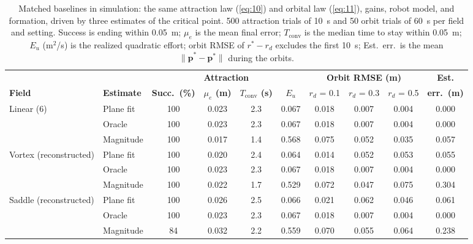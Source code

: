 \begin{table}[!t]
\centering
\footnotesize
\caption{Matched baselines in simulation: the same attraction law (\ref{eq:10}) and orbital law (\ref{eq:11}), gains, robot model, and formation, driven by three estimates of the critical point. 500 attraction trials of 10~s and 50 orbit trials of 60~s per field and setting. Success is ending within 0.05~m; $\mu_e$ is the mean final error; $T_{\mathrm{conv}}$ is the median time to stay within 0.05~m; $E_u$ (m$^2$/s) is the realized quadratic effort; orbit RMSE of $r^* - r_d$ excludes the first 10~s; Est.\ err.\ is the mean $\|\hat{\mathbf{p}}^* - \mathbf{p}^*\|$ during the orbits.}
\label{tab:baselines}
\setlength{\tabcolsep}{2.5pt}
\begin{tabular}{llcccc|ccc|c}
\hline
 & & \multicolumn{4}{c|}{\textbf{Attraction}} & \multicolumn{3}{c|}{\textbf{Orbit RMSE (m)}} & \textbf{Est.} \\
\textbf{Field} & \textbf{Estimate} & \textbf{Succ.\ (\%)} & \textbf{$\mu_e$ (m)} & \textbf{$T_{\mathrm{conv}}$ (s)} & \textbf{$E_u$} & $r_d$ = 0.1 & $r_d$ = 0.3 & $r_d$ = 0.5 & \textbf{err.\ (m)} \\
\hline
Linear (6) & Plane fit & 100 & 0.023 & 2.3 & 0.067 & 0.018 & 0.007 & 0.004 & 0.000 \\
 & Oracle & 100 & 0.023 & 2.3 & 0.067 & 0.018 & 0.007 & 0.004 & 0.000 \\
 & Magnitude & 100 & 0.017 & 1.4 & 0.568 & 0.075 & 0.052 & 0.035 & 0.057 \\
\hline
Vortex (reconstructed) & Plane fit & 100 & 0.020 & 2.4 & 0.064 & 0.014 & 0.052 & 0.053 & 0.055 \\
 & Oracle & 100 & 0.023 & 2.3 & 0.067 & 0.018 & 0.007 & 0.004 & 0.000 \\
 & Magnitude & 100 & 0.022 & 1.7 & 0.529 & 0.072 & 0.047 & 0.075 & 0.304 \\
\hline
Saddle (reconstructed) & Plane fit & 100 & 0.026 & 2.5 & 0.066 & 0.021 & 0.062 & 0.046 & 0.061 \\
 & Oracle & 100 & 0.023 & 2.3 & 0.067 & 0.018 & 0.007 & 0.004 & 0.000 \\
 & Magnitude & 84 & 0.032 & 2.2 & 0.559 & 0.070 & 0.055 & 0.064 & 0.238 \\
\hline
\end{tabular}
\end{table}
